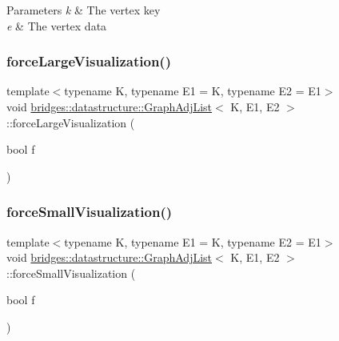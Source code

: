 \begin{DoxyParams}{Parameters}
{\em k} & The vertex key \\
\hline
{\em e} & The vertex data \\
\hline
\end{DoxyParams}
\mbox{\label{classbridges_1_1datastructure_1_1_graph_adj_list_a6860a0a153fd126ebe8b1bc40d2753a7}} 
\subsubsection{\texorpdfstring{force\+Large\+Visualization()}{forceLargeVisualization()}}
{\footnotesize\ttfamily template$<$typename K, typename E1 = K, typename E2 = E1$>$ \\
void \mbox{\hyperlink{classbridges_1_1datastructure_1_1_graph_adj_list}{bridges\+::datastructure\+::\+Graph\+Adj\+List}}$<$ K, E1, E2 $>$\+::force\+Large\+Visualization (\begin{DoxyParamCaption}\item[{bool}]{f }\end{DoxyParamCaption})\hspace{0.3cm}{\ttfamily [inline]}}

\mbox{\label{classbridges_1_1datastructure_1_1_graph_adj_list_a9706e3df7d30320b7e7773a6423e4ff7}} 
\subsubsection{\texorpdfstring{force\+Small\+Visualization()}{forceSmallVisualization()}}
{\footnotesize\ttfamily template$<$typename K, typename E1 = K, typename E2 = E1$>$ \\
void \mbox{\hyperlink{classbridges_1_1datastructure_1_1_graph_adj_list}{bridges\+::datastructure\+::\+Graph\+Adj\+List}}$<$ K, E1, E2 $>$\+::force\+Small\+Visualization (\begin{DoxyParamCaption}\item[{bool}]{f }\end{DoxyParamCaption})\hspace{0.3cm}{\ttfamily [inline]}}

